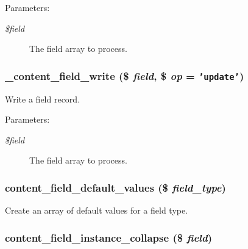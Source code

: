 \begin{Desc}
\item[Parameters:]
\begin{description}
\item[{\em \$field}]The field array to process. \end{description}
\end{Desc}
\hypertarget{content_8crud_8inc_d05ab93c679203625921d1ee307369f4}{
\subsubsection[{\_\-content\_\-field\_\-write}]{\setlength{\rightskip}{0pt plus 5cm}\_\-content\_\-field\_\-write (\$ {\em field}, \/  \$ {\em op} = {\tt 'update'})}}
\label{content_8crud_8inc_d05ab93c679203625921d1ee307369f4}


Write a field record.

\begin{Desc}
\item[Parameters:]
\begin{description}
\item[{\em \$field}]The field array to process. \end{description}
\end{Desc}
\hypertarget{content_8crud_8inc_07cd3757b31f4907a1b3c9c502e17ad7}{
\subsubsection[{content\_\-field\_\-default\_\-values}]{\setlength{\rightskip}{0pt plus 5cm}content\_\-field\_\-default\_\-values (\$ {\em field\_\-type})}}
\label{content_8crud_8inc_07cd3757b31f4907a1b3c9c502e17ad7}


Create an array of default values for a field type. \hypertarget{content_8crud_8inc_91ca2411f3edf5967fd2aa7a50020c0e}{
\subsubsection[{content\_\-field\_\-instance\_\-collapse}]{\setlength{\rightskip}{0pt plus 5cm}content\_\-field\_\-instance\_\-collapse (\$ {\em field})}}
\label{content_8crud_8inc_91ca2411f3edf5967fd2aa7a50020c0e}


